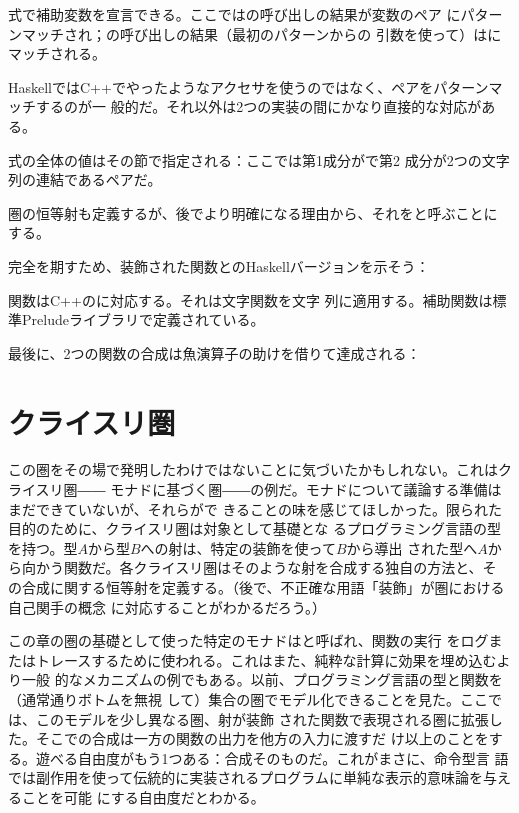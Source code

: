 式で補助変数を宣言できる。ここではの呼び出しの結果が変数のペア
にパターンマッチされ；の呼び出しの結果（最初のパターンからの
引数を使って）はにマッチされる。

HaskellではC++でやったようなアクセサを使うのではなく、ペアをパターンマッチするのが一
般的だ。それ以外は2つの実装の間にかなり直接的な対応がある。

式の全体の値はその節で指定される：ここでは第1成分がで第2
成分が2つの文字列の連結であるペアだ。

圏の恒等射も定義するが、後でより明確になる理由から、それをと呼ぶことに
する。

完全を期すため、装飾された関数とのHaskellバージョンを示そう：

関数はC++のに対応する。それは文字関数を文字
列に適用する。補助関数は標準Preludeライブラリで定義されている。

最後に、2つの関数の合成は魚演算子の助けを借りて達成される：


\section{クライスリ圏}

この圏をその場で発明したわけではないことに気づいたかもしれない。これはクライスリ圏――
モナドに基づく圏――の例だ。モナドについて議論する準備はまだできていないが、それらがで
きることの味を感じてほしかった。限られた目的のために、クライスリ圏は対象として基礎とな
るプログラミング言語の型を持つ。型$A$から型$B$への射は、特定の装飾を使って$B$から導出
された型へ$A$から向かう関数だ。各クライスリ圏はそのような射を合成する独自の方法と、そ
の合成に関する恒等射を定義する。（後で、不正確な用語「装飾」が圏における自己関手の概念
に対応することがわかるだろう。）

この章の圏の基礎として使った特定のモナドはと呼ばれ、関数の実行
をログまたはトレースするために使われる。これはまた、純粋な計算に効果を埋め込むより一般
的なメカニズムの例でもある。以前、プログラミング言語の型と関数を（通常通りボトムを無視
して）集合の圏でモデル化できることを見た。ここでは、このモデルを少し異なる圏、射が装飾
された関数で表現される圏に拡張した。そこでの合成は一方の関数の出力を他方の入力に渡すだ
け以上のことをする。遊べる自由度がもう1つある：合成そのものだ。これがまさに、命令型言
語では副作用を使って伝統的に実装されるプログラムに単純な表示的意味論を与えることを可能
にする自由度だとわかる。


